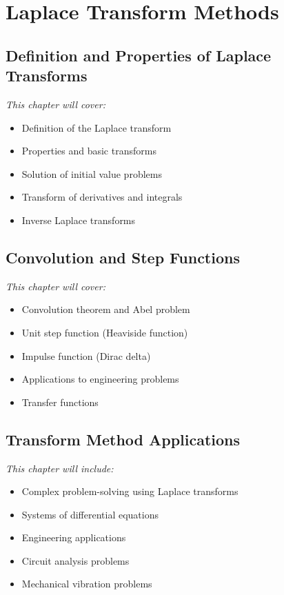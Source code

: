 \documentclass[12pt, letterpaper]{book}
\theoremstyle{problemstyle}
\theoremstyle{solutionstyle}
\begin{document}
\part{Laplace Transform Methods}
\label{part:laplace_transforms}

\chapter{Definition and Properties of Laplace Transforms}
\label{chap:session_11}

\textit{This chapter will cover:}
\begin{itemize}
    \item Definition of the Laplace transform
    \item Properties and basic transforms
    \item Solution of initial value problems
    \item Transform of derivatives and integrals
    \item Inverse Laplace transforms
\end{itemize}

\chapter{Convolution and Step Functions}
\label{chap:session_12}

\textit{This chapter will cover:}
\begin{itemize}
    \item Convolution theorem and Abel problem
    \item Unit step function (Heaviside function)
    \item Impulse function (Dirac delta)
    \item Applications to engineering problems
    \item Transfer functions
\end{itemize}

\chapter{Transform Method Applications}
\label{chap:session_13}

\textit{This chapter will include:}
\begin{itemize}
    \item Complex problem-solving using Laplace transforms
    \item Systems of differential equations
    \item Engineering applications
    \item Circuit analysis problems
    \item Mechanical vibration problems
\end{itemize}
\end{document}
